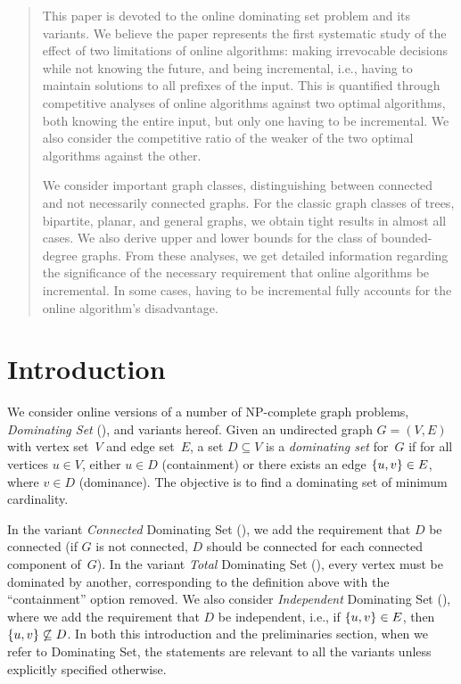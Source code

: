 \date{Received: date / Accepted: date}


\maketitle

\begin{abstract}
This paper is devoted to the online dominating set problem and its
variants.
We believe the paper represents the first systematic study of
the effect of two limitations of online algorithms:
making irrevocable decisions while not knowing the future,
and being incremental,
i.e., having to maintain solutions to all prefixes of the input.
This is quantified through competitive analyses of online algorithms
against two optimal algorithms, both knowing the entire input,
but only one having to be incremental.
We also consider the competitive ratio of the weaker of the two optimal
algorithms against the other.

We consider important graph classes,
distinguishing between connected and not necessarily connected graphs.
For the classic graph classes of trees, bipartite, planar, and general
graphs, we obtain tight results in almost all cases.
We also derive upper and lower bounds for the class of bounded-degree graphs.
From these analyses, we get detailed information regarding the 
significance of the necessary requirement that online algorithms be
incremental. In some cases, having to be incremental
fully accounts for the online algorithm's disadvantage.
\end{abstract}

\section{Introduction}
We consider online versions of a number of NP-complete graph problems,
\emph{Dominating Set} (\ds), and variants hereof.
Given an undirected graph $G=(V,E)$ with vertex set~$V$ and edge set~$E$,
a set $D\subseteq V$ is a \emph{dominating set} for~$G$ if for all
vertices $u\in V$, either $u\in D$ (containment) or there exists an edge
$\left\{u,v\right\}\in E$, where $v\in D$ (dominance).
The objective is to find a dominating set of minimum cardinality.

In the variant \emph{Connected} Dominating Set (\cds), we add the requirement
that $D$ be connected (if $G$ is not connected, $D$ should be connected
for each connected component of~$G$).
In the variant \emph{Total} Dominating Set (\tds),
every vertex must be dominated
by another, corresponding to the definition above with the
``containment'' option removed.
We also consider \emph{Independent} Dominating Set (\ids), where we add
the requirement that $D$ be independent, i.e., if $\left\{u,v\right\}\in E$,
then $\left\{u,v\right\}\not\subseteq D$.
In both this introduction and the preliminaries section, 
when we refer to Dominating Set, the statements 
are relevant to all the variants unless explicitly specified otherwise.

